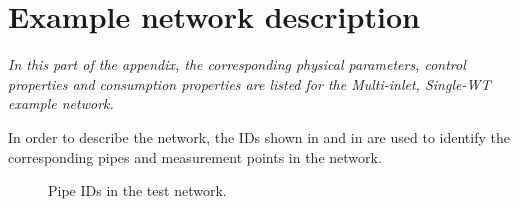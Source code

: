\chapter{Example network description}
\label{physical_properties_example1}

\emph{In this part of the appendix, the corresponding physical parameters, control properties and consumption properties are listed for the Multi-inlet, Single-WT example network.}

In order to describe the network, the IDs shown in  and in  are used to identify the corresponding pipes and measurement points in the network. 

\begin{figure}[H]
\centering
 
\caption{Pipe IDs in the test network.}
\label{fig:epanet_example1_id_pipes}
\end{figure}
\vspace{-3mm}




